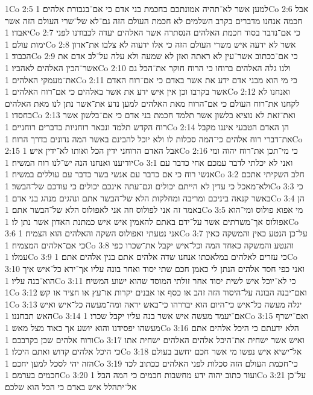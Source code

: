 1Co 2:5  למען אשר לא־תהיה אמונתכם בחכמת בני אדם כי אם־בגבורת אלהים׃
1Co 2:6  אבל חכמה אנחנו מדברים בקרב השלמים לא חכמת העולם הזה גם־לא של־שרי העולם הזה אשר יאבדו׃
1Co 2:7  כי אם־נדבר בסוד חכמת האלהים הנסתרה אשר האלהים יעדה לכבודנו לפני ימות עולם׃
1Co 2:8  אשר לא ידעה איש משרי העולם הזה כי אלו ידעוה לא צלבו את־אדון הכבוד׃
1Co 2:9  כי אם־ככתוב אשר־עין לא ראתה ואזן לא שמעה ולא עלה על־לב אדם את אשר־הכין האלהים לאהביו׃
1Co 2:10  ולנו גלה האלהים ברוחו כי הרוח חוקר את־הכל גם את־מעמקי האלהים׃
1Co 2:11  כי מי הוא מבני אדם ידע את אשר באדם כי אם־רוח האדם אשר בקרבו וכן אין איש ידע את אשר באלהים כי אם־רוח האלהים׃
1Co 2:12  ואנחנו לא לקחנו את־רוח העולם כי אם־הרוח מאת האלהים למען נדע את־אשר נתן לנו מאת האלהים בחסדו׃
1Co 2:13  ואת־זאת לא נוציא בלשון אשר תלמד חכמת בני אדם כי אם־בלשון אשר רוח הקדש תלמד ונבאר רוחניות בדברים רוחניים׃
1Co 2:14  הן האדם הטבעי איננו מקבל את־דברי רוח אלהים כי־המה סכלות לו ולא יוכל להבינם באשר המה נדונים בדרך הרוח׃
1Co 2:15  אבל האדם הרוחני ידין הכל ואותו לא־ידין איש׃
1Co 2:16  כי מי־תכן את־רוח יהוה ומי יודיענו ואנחנו הנה יש־לנו רוח המשיח׃
1Co 3:1  ואני לא יכלתי לדבר עמכם אחי כדבר עם אנשי רוח כי אם כדבר עם אנשי בשר כדבר עם עוללים במשיח׃
1Co 3:2  חלב השקיתי אתכם ולא־מאכל כי עדין לא הייתם יכולים וגם־עתה אינכם יכולים כי עודכם של־הבשר׃
1Co 3:3  כי באשר קנאה ביניכם ומריבה ומחלקות הלא של־הבשר אתם ונהגים מנהג בני אדם׃
1Co 3:4  הן באמר זה אני לפולוס וזה אני לאפולוס הלא של־הבשר אתם׃
1Co 3:5  מי אפוא פולוס ומי־הוא אפולוס אך־משרתים אשר על־ידם באתם להאמין איש איש כמתנת האדון אשר נתן לו׃
1Co 3:6  אני נטעתי ואפולוס השקה והאלהים הוא הצמיח׃
1Co 3:7  על־כן הנטע כאין והמשקה כאין כי אם־אלהים המצמיח׃
1Co 3:8  והנטע והמשקה כאחד המה וכל־איש יקבל את־שכרו כפי עמלו׃
1Co 3:9  כי עזרים לאלהים במלאכתו אנחנו שדה אלהים אתם בנין אלהים אתם׃
1Co 3:10  ואני כפי חסד אלהים הנתן לי כאמן חכם שתי יסוד ואחר בונה עליו אך־ירא כל־איש איך הוא־בנה עליו׃
1Co 3:11  כי לא־יוכל איש לשית יסוד אחר זולתי המוסד שהוא ישוע המשיח׃
1Co 3:12  ואם־יבנה הבונה על־היסוד הזה זהב או כסף או אבנים יקרות או־עץ או חציר או קש׃
1Co 3:13  יגלה מעשה כל־איש כי־היום הוא יבררהו כי־באש יראה ומה־מעשה כל־איש ואיש האש תבחננו׃
1Co 3:14  אם־יעמד מעשה איש אשר בנה עליו יקבל שכרו׃
1Co 3:15  ואם־ישרף מעשהו יפסידנו והוא יושע אך כאוד מצל מאש׃
1Co 3:16  הלא ידעתם כי היכל אלהים אתם ורוח אלהים שכן בקרבכם׃
1Co 3:17  ואיש אשר ישחית את־היכל אלהים האלהים ישחית אתו כי היכל אלהים קדוש ואתם היכלו׃
1Co 3:18  אל־ישיא איש נפשו מי אשר חכם יחשב בעולם הזה יהי לסכל למען יחכם׃
1Co 3:19  כי־חכמת העולם הזה סכלות לפני האלהים ככתוב לכד חכמים בערמם׃
1Co 3:20  ועוד כתוב יהוה ידע מחשבות חכמים כי המה הבל׃
1Co 3:21  על־כן אל־יתהלל איש באדם כי הכל הוא שלכם׃
